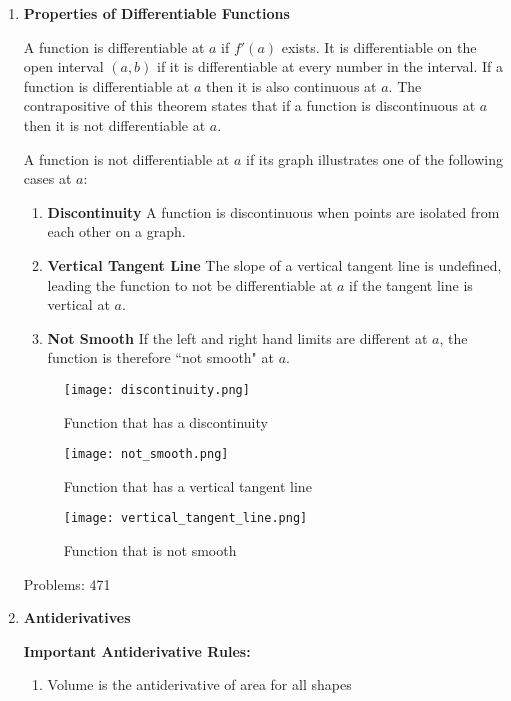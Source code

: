\documentclass[11pt,twoside]{article}
\begin{document}
\begin{enumerate}

\item \textbf{Properties of Differentiable Functions}

A function is differentiable at $a$ if $f'(a)$ exists. It is differentiable on the open interval $(a, b)$ if it is differentiable at every number in the interval. If a function is differentiable at $a$ then it is also continuous at $a$. The contrapositive of this theorem states that if a function is discontinuous at $a$ then it is not differentiable at $a$.

A function is not differentiable at $a$ if its graph illustrates one of the following cases at $a$:

\begin{enumerate}
    \item \textbf{Discontinuity}
    A function is discontinuous when points are isolated from each other on a graph.
    
    \item \textbf{Vertical Tangent Line}
    The slope of a vertical tangent line is undefined, leading the function to not be differentiable at $a$ if the tangent line is vertical at $a$. 
    
    \item \textbf{Not Smooth}
    If the left and right hand limits are different at $a$, the function is therefore ``not smooth" at $a$. 
\end{enumerate}

\begin{figure}[H]
  \texttt{[image: discontinuity.png]}
  \caption{Function that has a discontinuity}\label{fig:awesome_image1}
\endminipage\hfill
{}
  \texttt{[image: not\_smooth.png]}
  \caption{Function that has a vertical tangent line}\label{fig:awesome_image2}
\endminipage\hfill
{}%
  \texttt{[image: vertical\_tangent\_line.png]}
  \caption{Function that is not smooth}\label{fig:awesome_image3}
\endminipage
\end{figure}

Problems: 471

\item \textbf{Antiderivatives}

\textbf{Important Antiderivative Rules:}
\begin{enumerate}
    \item Volume is the antiderivative of area for all shapes
\end{enumerate}


\end{enumerate}
\end{document}
